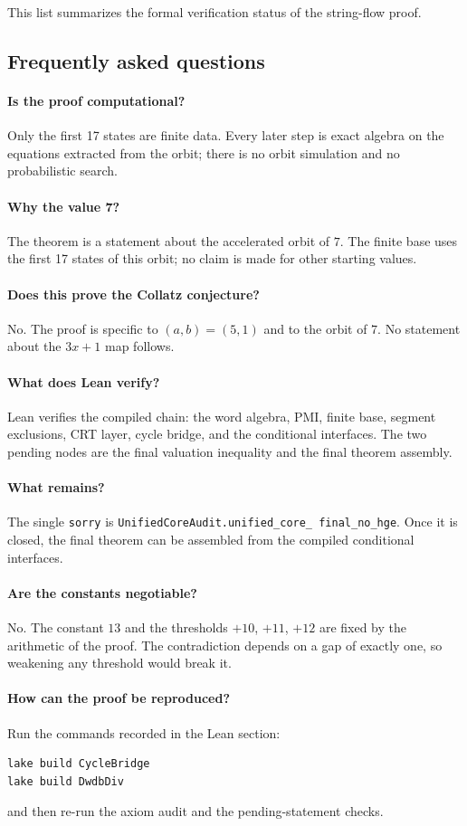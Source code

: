 This list summarizes the formal verification status of the string-flow proof.

\subsection{Frequently asked questions}

\paragraph{Is the proof computational?}
Only the first 17 states are finite data.  Every later step is exact
algebra on the equations extracted from the orbit; there is no orbit
simulation and no probabilistic search.

\paragraph{Why the value 7?}
The theorem is a statement about the accelerated orbit of $7$.  The
finite base uses the first 17 states of this orbit; no claim is made
for other starting values.

\paragraph{Does this prove the Collatz conjecture?}
No.  The proof is specific to $(a,b)=(5,1)$ and to the orbit of $7$.
No statement about the $3x+1$ map follows.

\paragraph{What does Lean verify?}
Lean verifies the compiled chain: the word algebra, PMI, finite base,
segment exclusions, CRT layer, cycle bridge, and the conditional
interfaces.  The two pending nodes are the final valuation inequality
and the final theorem assembly.

\paragraph{What remains?}
The single \texttt{sorry} is
\texttt{UnifiedCoreAudit.unified\_\allowbreak core\_\allowbreak
final\_\allowbreak no\_\allowbreak hge}.  Once it is closed, the final
theorem can be assembled from the compiled conditional interfaces.

\paragraph{Are the constants negotiable?}
No.  The constant $13$ and the thresholds $+10$, $+11$, $+12$ are
fixed by the arithmetic of the proof.  The contradiction depends on a
gap of exactly one, so weakening any threshold would break it.

\paragraph{How can the proof be reproduced?}
Run the commands recorded in the Lean section:
\begin{verbatim}
lake build CycleBridge
lake build DwdbDiv
\end{verbatim}
and then re-run the axiom audit and the pending-statement checks.
